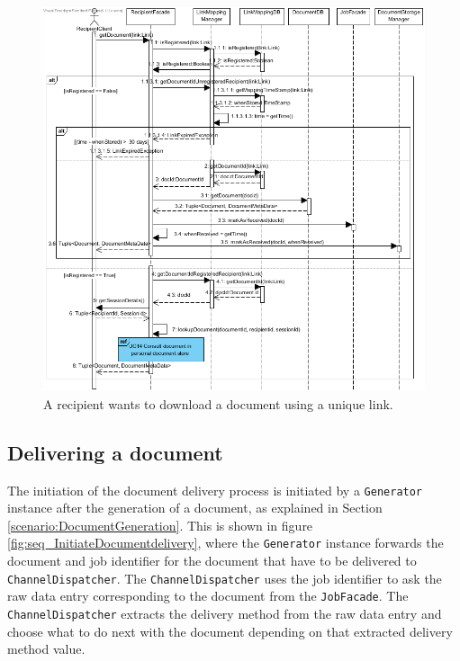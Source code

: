 \documentclass[a4paper,10pt]{article}
\begin{document}
\begin{figure}[!htp]
    \centering
    \includegraphics[width=\textwidth]{DownloadDocumentViaUniqueLink.png}
    \caption{A recipient wants to download a document using a unique link.
        }\label{fig:seq_DownloadDocumentViaUniqueLink}
\end{figure}





\subsection{Delivering a document}
\label{scenario:DeliverDoc}
The initiation of the document delivery process is initiated by a \texttt{Generator} instance after the generation of a document, as explained in Section \ref{scenario:DocumentGeneration}. This is shown in figure \ref{fig:seq_InitiateDocumentdelivery}, where the \texttt{Generator} instance forwards the document and job identifier for the document that have to be delivered to \texttt{ChannelDispatcher}. The \texttt{ChannelDispatcher} uses the job identifier to ask the raw data entry corresponding to the document from the \texttt{JobFacade}. The \texttt{ChannelDispatcher} extracts the delivery method from the raw data entry and choose what to do next with the document depending on that extracted delivery method value. \\
\end{document}
